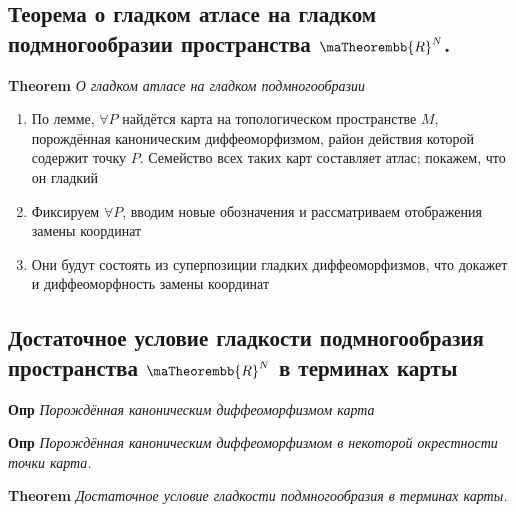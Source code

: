 \documentclass[a4paper, 14pt]{article}
\begin{document}
    \subsection{Теорема о гладком атласе на гладком подмногообразии пространства $\maTheorembb{R}^N$.}
    
    \textbf{Theorem} \textit{О гладком атласе на гладком подмногообразии}
    
    \begin{enumerate}
        \item По лемме, $\forall P$ найдётся карта на топологическом пространстве $M$, порождённая каноническим
        диффеоморфизмом, район действия которой содержит точку $P$.
        Семейство всех таких карт составляет атлас; покажем, что он гладкий
        \item Фиксируем $\forall P$, вводим новые обозначения и рассматриваем отображения замены координат
        \item Они будут состоять из суперпозиции гладких диффеоморфизмов, что докажет и диффеоморфность замены координат
    \end{enumerate}
    
    \subsection{Достаточное условие гладкости подмногообразия пространства $\maTheorembb{R}^N$ в терминах карты}
    
    \textbf{Опр} \textit{Порождённая каноническим диффеоморфизмом карта}
    
    \textbf{Опр} \textit{Порождённая каноническим диффеоморфизмом в некоторой окрестности точки карта.}
    
    \textbf{Theorem} \textit{Достаточное условие гладкости подмногообразия в терминах карты.}
    
\end{document}
